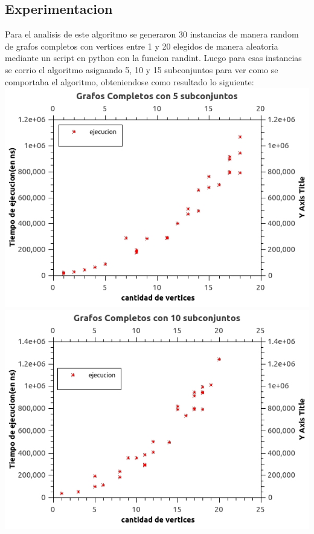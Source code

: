 \subsection{Experimentacion}
Para el analisis de este algoritmo se generaron 30 instancias de manera random de grafos completos con vertices entre 1 y 20 elegidos de manera aleatoria mediante un script en python con la funcion randint.
Luego para esas instancias se corrio el algoritmo asignando 5, 10 y 15 subconjuntos para ver como se comportaba el algoritmo, obteniendose como resultado lo siguiente:\\
\includegraphics[scale=0.5]{Ej2/k5.jpg}
\includegraphics[scale=0.5]{Ej2/k10.jpg}\\
